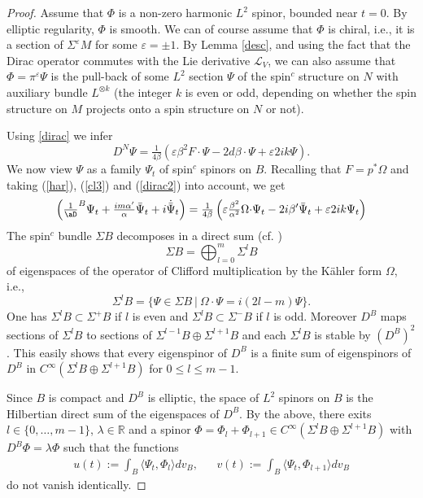 \documentclass[12pt]{amsart}
\begin{document}
\begin{proof}
Assume that $\Phi$ is a non-zero harmonic $L^2$ spinor, 
bounded near $t=0$. By elliptic regularity, $\Phi$ is smooth. 
We can of course assume that $\Phi$ is chiral, i.e., it is a section 
of $\Sigma^{\varepsilon} M$ for some ${\varepsilon}=\pm1$. By Lemma \ref{desc}, 
and using the fact that the Dirac operator commutes with 
the Lie derivative ${\mathcal{L}}_V$, we can also assume that $\Phi=\pi^{\varepsilon}{\Psi}$ 
is the pull-back of some $L^2$ section ${\Psi}$ of the spin$^c$ structure 
on $N$ with auxiliary bundle $L^{\otimes k}$ (the integer $k$ is even or odd, 
depending on whether the spin structure on $M$ projects onto 
a spin structure on $N$ or not).

Using \eqref{dirac} we infer
\begin{equation}\label{har}
D^N{\Psi}=\tfrac{1}{4{\beta}}({\varepsilon} {\beta}^2F{{\cdot}}{\Psi}-2d{\beta}{{\cdot}}{\Psi}+{\varepsilon} 2ik{\Psi}).
\end{equation}
We now view ${\Psi}$ as a family ${\Psi}_t$ of spin$^c$ spinors on $B$.
Recalling that $F=p^*{\Omega}$ and taking (\ref{har}),
(\ref{cl3}) and (\ref{dirac2}) into account, we get
\begin{equation}\label{eq1}\left(\tfrac{1}\aD^B{\Psi}_t+
\tfrac{im{\alpha}'}{\alpha}\bar{\Psi}_t+i{\dot{\bar{\Psi}}_t}\right)=
\tfrac{1}{4{\beta}}\left({\varepsilon}\tfrac{{\beta}^2}{{\alpha} ^2}\Omega{{\cdot}}{\Psi}_t-2i{\beta}'\bar{\Psi}_t+{\varepsilon}
  2ik{\Psi}_t\right) 
\end{equation}
The spin$^c$ bundle $\Sigma B$ decomposes in a direct
sum (cf. \cite{ki})
$$\Sigma B=\bigoplus_{l=0}^m\Sigma ^lB$$
of eigenspaces of the operator of Clifford multiplication by the K\"ahler form
$\Omega$, i.e., 
$$\Sigma ^lB=\{{\Psi}\in\Sigma B\ |\ \Omega{{\cdot}}{\Psi}=i(2l-m){\Psi}\}.$$
One has  $\Sigma ^lB\subset \Sigma ^+B$ if $l$ is even and 
$\Sigma ^lB\subset \Sigma ^-B$ if $l$ is odd. Moreover $D^B$ maps
sections of $\Sigma ^lB$ to sections of $\Sigma ^{l-1}B\oplus\Sigma
^{l+1}B$ and each $\Sigma ^lB$ is stable by $(D^B)^2$. This easily
shows that every eigenspinor of $D^B$ is a finite sum of eigenspinors
of $D^B$ in $C^\infty(\Sigma ^lB\oplus \Sigma 
^{l+1}B)$ for $0\le l\le m-1$.

Since $B$ is compact and $D^B$ is elliptic, the space of $L^2$ spinors
on $B$ is the Hilbertian direct sum of the eigenspaces of $D^B$. By
the above, there exits $l\in\{0,\ldots, m-1\}$, $\lambda\in{{\mathbb R}}$ and  
a spinor $\Phi=\Phi_l+\Phi_{l+1}\in C^\infty(\Sigma ^lB\oplus \Sigma
^{l+1}B)$ with $D^B\Phi=\lambda\Phi$ such that the functions
\begin{align*}
u(t):=\int_B{\langle}{\Psi}_t,\Phi_l{\rangle} dv_B,&&
v(t):=\int_B{\langle}{\Psi}_t,\Phi_{l+1}{\rangle} dv_B
\end{align*}
do not vanish identically.


\end{proof}
\end{document}
